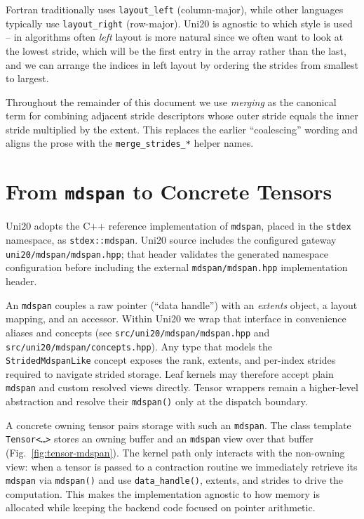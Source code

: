 \documentclass[11pt]{article}
\begin{document}
Fortran traditionally uses \texttt{layout\_left} (column-major), while other languages typically use \texttt{layout\_right}
(row-major). Uni20 is agnostic to which style is used -- in algorithms often \emph{left} layout is more natural since
we often want to look at the lowest stride, which will be the first entry in the array rather than the last, and we can
arrange the indices in left layout by ordering the strides from smallest to largest.

Throughout the remainder of this document we use \emph{merging} as the canonical term for combining
adjacent stride descriptors whose outer stride equals the inner stride multiplied by the extent.
This replaces the earlier ``coalescing'' wording and aligns the prose with the
\texttt{merge\_strides\_*} helper names.

\section{From \texttt{mdspan} to Concrete Tensors}
Uni20 adopts the C++ reference implementation of \texttt{mdspan}, placed in the
\texttt{stdex} namespace, as \texttt{stdex::mdspan}. Uni20 source includes the
configured gateway \texttt{uni20/mdspan/mdspan.hpp}; that header validates the
generated namespace configuration before including the external
\texttt{mdspan/mdspan.hpp} implementation header.

An \texttt{mdspan} couples a
raw pointer (``data handle'') with an \emph{extents} object, a layout mapping, and an accessor.
Within Uni20 we wrap that interface in convenience aliases and concepts (see
\texttt{src/uni20/mdspan/mdspan.hpp} and
\texttt{src/uni20/mdspan/concepts.hpp}). Any type that models the
\texttt{StridedMdspanLike} concept exposes the rank, extents, and per-index strides
required to navigate strided storage. Leaf kernels may therefore accept plain
\texttt{mdspan} and custom resolved views directly. Tensor wrappers remain a
higher-level abstraction and resolve their \texttt{mdspan()} only at the
dispatch boundary.

A concrete owning tensor pairs storage with such an \texttt{mdspan}.  The class template
\texttt{Tensor<\ldots>} stores an owning buffer and an \texttt{mdspan} view over that buffer
(Fig.~\ref{fig:tensor-mdspan}).  The kernel path only interacts with the non-owning view: when a
tensor is passed to a contraction routine we immediately retrieve its \texttt{mdspan} via
\texttt{mdspan()} and use \texttt{data\_handle()}, extents, and strides to drive the computation.
This makes the implementation agnostic to how memory is allocated while keeping the backend code
focused on pointer arithmetic.
\end{document}
